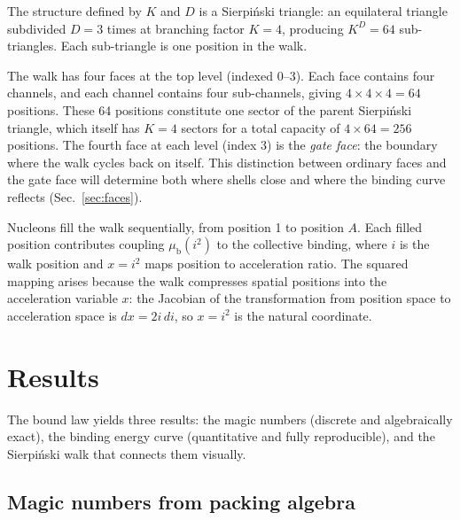 \documentclass[fleqn,usenatbib]{mnras}
\begin{document}
The structure defined by $K$ and $D$ is a Sierpi\'nski triangle: an equilateral triangle subdivided $D = 3$ times at branching factor $K = 4$, producing $K^D = 64$ sub-triangles. Each sub-triangle is one position in the walk.

The walk has four faces at the top level (indexed 0--3). Each face contains four channels, and each channel contains four sub-channels, giving $4 \times 4 \times 4 = 64$ positions. These 64 positions constitute one sector of the parent Sierpi\'nski triangle, which itself has $K = 4$ sectors for a total capacity of $4 \times 64 = 256$ positions. The fourth face at each level (index 3) is the \emph{gate face}: the boundary where the walk cycles back on itself. This distinction between ordinary faces and the gate face will determine both where shells close and where the binding curve reflects (Sec.~\ref{sec:faces}).

Nucleons fill the walk sequentially, from position 1 to position $A$. Each filled position contributes coupling $\mu_{\mathrm{b}}(i^2)$ to the collective binding, where $i$ is the walk position and $x = i^2$ maps position to acceleration ratio. The squared mapping arises because the walk compresses spatial positions into the acceleration variable $x$: the Jacobian of the transformation from position space to acceleration space is $dx = 2i\,di$, so $x = i^2$ is the natural coordinate.

\section{Results}
\label{sec:results}

The bound law yields three results: the magic numbers (discrete and algebraically exact), the binding energy curve (quantitative and fully reproducible), and the Sierpi\'nski walk that connects them visually.

\subsection{Magic numbers from packing algebra}
\label{sec:magic}
\end{document}
